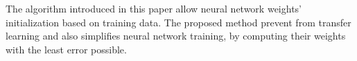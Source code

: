 The algorithm introduced in this paper allow
neural network weights' initialization based on training data. 
The proposed method prevent from transfer learning 
and also simplifies neural network training, 
by computing their weights with the least error possible. 
